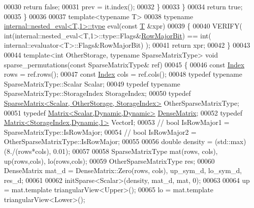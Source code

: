 \begin{DoxyCode}
00030         \textcolor{keywordflow}{return} \textcolor{keyword}{false};
00031       prev = it.index();
00032     \}
00033   \}
00034   \textcolor{keywordflow}{return} \textcolor{keyword}{true};
00035 \}
00036 
00037 \textcolor{keyword}{template}<\textcolor{keyword}{typename} T>
00038 \textcolor{keyword}{typename} \hyperlink{class_eigen_1_1internal_1_1_tensor_lazy_evaluator_writable}{internal::nested\_eval<T,1>::type} eval(\textcolor{keyword}{const} 
      \hyperlink{group___sparse_core___module}{T} &xpr)
00039 \{
00040   VERIFY( \textcolor{keywordtype}{int}(internal::nested\_eval<T,1>::type::Flags&\hyperlink{group__flags_gae4f56c2a60bbe4bd2e44c5b19cbe8762}{RowMajorBit}) == \textcolor{keywordtype}{int}(
      internal::evaluator<T>::Flags&RowMajorBit) );
00041   \textcolor{keywordflow}{return} xpr;
00042 \}
00043 
00044 \textcolor{keyword}{template}<\textcolor{keywordtype}{int} OtherStorage, \textcolor{keyword}{typename} SparseMatrixType> \textcolor{keywordtype}{void} sparse\_permutations(\textcolor{keyword}{const} SparseMatrixType& ref)
00045 \{
00046   \textcolor{keyword}{const} \hyperlink{namespace_eigen_a62e77e0933482dafde8fe197d9a2cfde}{Index} rows = ref.rows();
00047   \textcolor{keyword}{const} \hyperlink{namespace_eigen_a62e77e0933482dafde8fe197d9a2cfde}{Index} cols = ref.cols();
00048   \textcolor{keyword}{typedef} \textcolor{keyword}{typename} SparseMatrixType::Scalar Scalar;
00049   \textcolor{keyword}{typedef} \textcolor{keyword}{typename} SparseMatrixType::StorageIndex StorageIndex;
00050   \textcolor{keyword}{typedef} \hyperlink{group___sparse_core___module_class_eigen_1_1_sparse_matrix}{SparseMatrix<Scalar, OtherStorage, StorageIndex>} 
      OtherSparseMatrixType;
00051   \textcolor{keyword}{typedef} \hyperlink{group___core___module}{Matrix<Scalar,Dynamic,Dynamic>} 
      \hyperlink{group___core___module}{DenseMatrix};
00052   \textcolor{keyword}{typedef} \hyperlink{group___core___module}{Matrix<StorageIndex,Dynamic,1>} VectorI;
00053 \textcolor{comment}{//   bool IsRowMajor1 = SparseMatrixType::IsRowMajor;}
00054 \textcolor{comment}{//   bool IsRowMajor2 = OtherSparseMatrixType::IsRowMajor;}
00055   
00056   \textcolor{keywordtype}{double} density = (std::max)(8./(rows*cols), 0.01);
00057   
00058   SparseMatrixType mat(rows, cols), up(rows,cols), lo(rows,cols);
00059   OtherSparseMatrixType res;
00060   DenseMatrix mat\_d = DenseMatrix::Zero(rows, cols), up\_sym\_d, lo\_sym\_d, res\_d;
00061   
00062   initSparse<Scalar>(density, mat\_d, mat, 0);
00063 
00064   up = mat.template triangularView<Upper>();
00065   lo = mat.template triangularView<Lower>();

\end{DoxyCode}
